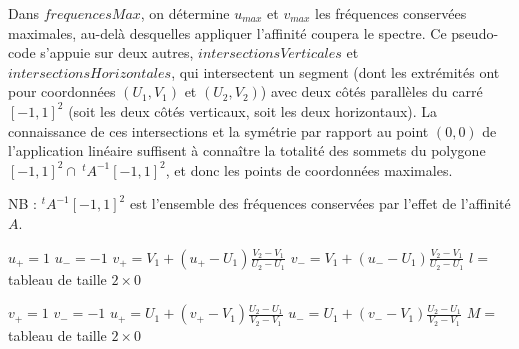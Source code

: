   Dans $frequencesMax$, on détermine $u_{max}$ et $v_{max}$ les fréquences conservées maximales, au-delà desquelles appliquer l'affinité coupera le spectre. Ce pseudo-code s'appuie sur deux autres, $intersectionsVerticales$ et $intersectionsHorizontales$, qui intersectent un segment (dont les extrémités ont pour coordonnées $(U_1,V_1)$ et $(U_2,V_2)$) avec deux côtés parallèles du carré $[-1,1]^2$ (soit les deux côtés verticaux, soit les deux horizontaux). La connaissance de ces intersections et la symétrie par rapport au point $(0,0)$ de l'application linéaire suffisent à connaître la totalité des sommets du polygone $[-1,1]^2 \cap \ ^t\!\!A^{-1}[-1,1]^2$, et donc les points de coordonnées maximales.
  
  NB : $^t\!\!A^{-1}[-1,1]^2$ est l'ensemble des fréquences conservées par l'effet de l'affinité $A$.
  
  \begin{algorithme}
   $u_+ = 1$\;
   $u_- = -1$\;
   $v_+ = V_1+(u_+-U_1)\frac{V_2-V_1}{U_2-U_1}$\;
   $v_- = V_1+(u_--U_1)\frac{V_2-V_1}{U_2-U_1}$\;
   $l =$ tableau de taille $2 \times 0$\;
   \caption{$intersectionsVerticales(U_1,V_1,U_2,V_2)$}
   \label{szeliski_intersectionsVerticales}
  \end{algorithme}










  \begin{algorithme}
   $v_+ = 1$\;
   $v_- = -1$\;
   $u_+ = U_1+(v_+-V_1)\frac{U_2-U_1}{V_2-V_1}$\;
   $u_- = U_1+(v_--V_1)\frac{U_2-U_1}{V_2-V_1}$\;
   $M =$ tableau de taille $2 \times 0$\;
   \caption{$intersectionsHorizontales(U_1,V_1,U_2,V_2)$}
   \label{szeliski_intersectionsHorizontales}
  \end{algorithme}










